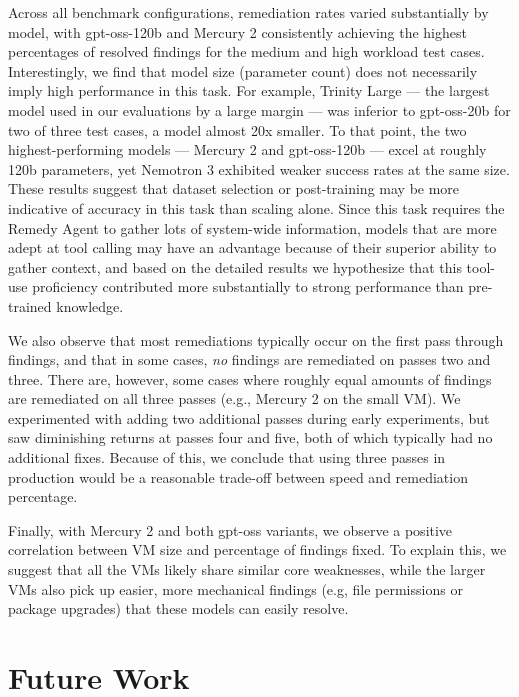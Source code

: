 \documentclass[pdflatex,sn-mathphys-num]{sn-jnl}%
\begin{document}
Across all benchmark configurations, remediation rates varied substantially by model, with gpt-oss-120b and Mercury 2 consistently achieving the highest percentages of resolved findings for the medium and high workload test cases. Interestingly, we find that model size (parameter count) does not necessarily imply high performance in this task. For example, Trinity Large --- the largest model used in our evaluations by a large margin --- was inferior to gpt-oss-20b for two of three test cases, a model almost 20x smaller. To that point, the two highest-performing models --- Mercury 2 and gpt-oss-120b --- excel at roughly 120b parameters, yet Nemotron 3 exhibited weaker success rates at the same size. These results suggest that dataset selection or post-training may be more indicative of accuracy in this task than scaling alone. Since this task requires the Remedy Agent to gather lots of system-wide information, models that are more adept at tool calling may have an advantage because of their superior ability to gather context, and based on the detailed results we hypothesize that this tool-use proficiency contributed more substantially to strong performance than pre-trained knowledge. 

We also observe that most remediations typically occur on the first pass through findings, and that in some cases, \emph{no} findings are remediated on passes two and three. There are, however, some cases where roughly equal amounts of findings are remediated on all three passes (e.g., Mercury 2 on the small VM). We experimented with adding two additional passes during early experiments, but saw diminishing returns at passes four and five, both of which typically had no additional fixes. Because of this, we conclude that using three passes in production would be a reasonable trade-off between speed and remediation percentage.

Finally, with Mercury 2 and both gpt-oss variants, we observe a positive correlation between VM size and percentage of findings fixed. To explain this, we suggest that all the VMs likely share similar core weaknesses, while the larger VMs also pick up easier, more mechanical findings (e.g, file permissions or package upgrades) that these models can easily resolve.




\section{Future Work}\label{sec:future}
\end{document}
